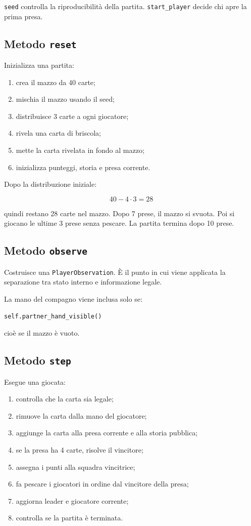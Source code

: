 \documentclass[11pt,a4paper]{article}
\begin{document}
\texttt{seed} controlla la riproducibilità della partita. \texttt{start\_player}
decide chi apre la prima presa.

\subsection{Metodo \texttt{reset}}

Inizializza una partita:

\begin{enumerate}
  \item crea il mazzo da 40 carte;
  \item mischia il mazzo usando il seed;
  \item distribuisce 3 carte a ogni giocatore;
  \item rivela una carta di briscola;
  \item mette la carta rivelata in fondo al mazzo;
  \item inizializza punteggi, storia e presa corrente.
\end{enumerate}

Dopo la distribuzione iniziale:

\[
40 - 4\cdot 3 = 28
\]

quindi restano 28 carte nel mazzo. Dopo 7 prese, il mazzo si svuota. Poi si
giocano le ultime 3 prese senza pescare. La partita termina dopo 10 prese.

\subsection{Metodo \texttt{observe}}

Costruisce una \texttt{PlayerObservation}. È il punto in cui viene applicata la
separazione tra stato interno e informazione legale.

La mano del compagno viene inclusa solo se:

\begin{verbatim}
self.partner_hand_visible()
\end{verbatim}

cioè se il mazzo è vuoto.

\subsection{Metodo \texttt{step}}

Esegue una giocata:

\begin{enumerate}
  \item controlla che la carta sia legale;
  \item rimuove la carta dalla mano del giocatore;
  \item aggiunge la carta alla presa corrente e alla storia pubblica;
  \item se la presa ha 4 carte, risolve il vincitore;
  \item assegna i punti alla squadra vincitrice;
  \item fa pescare i giocatori in ordine dal vincitore della presa;
  \item aggiorna leader e giocatore corrente;
  \item controlla se la partita è terminata.
\end{enumerate}
\end{document}
